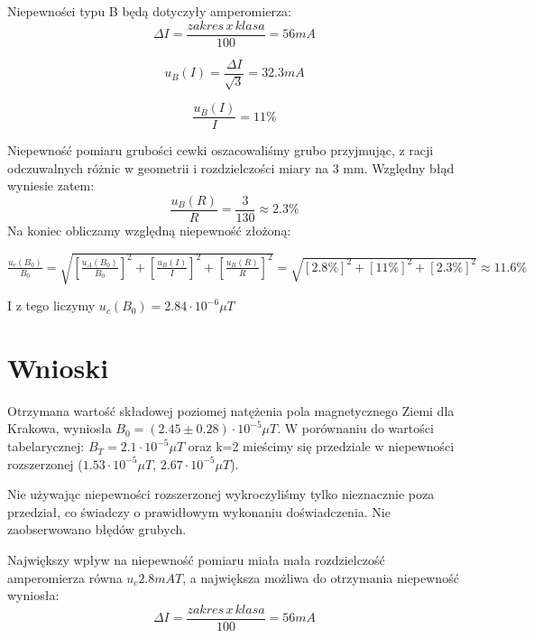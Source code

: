 \documentclass{article}
\begin{document}
Niepewności typu B będą dotyczyły amperomierza:
\begin{equation}
\Delta I = \frac{zakres \, x \, klasa}{100} = 56 mA
\end{equation}

\begin{equation}
u_B(I) = \frac{\Delta I}{\sqrt{3}} = 32.3 mA 
\end{equation}

\begin{equation}
\frac{u_B(I)}{I} = 11 \%
\end{equation}

Niepewność pomiaru grubości cewki oszacowaliśmy grubo przyjmując, z racji odczuwalnych różnic w geometrii i rozdzielczości miary na 3 mm.
Względny błąd wyniesie zatem:
\begin{equation}
\frac{u_B(R)}{R} = 	\frac{3}{130} \approx 2.3 \%
\end{equation}
Na koniec obliczamy względną niepewność złożoną: \\ \newline
\newline
\centerline{$\frac{u_c(B_0)}{B_0} = \sqrt{[\frac{u_A(B_0)}{B_0}]^2 + [\frac{u_B(I)}{I}]^2 + [\frac{u_B(R)}{R}]^2} = \sqrt{[2.8\%]^2+[11\%]^2+[2.3\%]^2} \approx 11.6 \%$}
\newline
\newline
I z tego liczymy $u_c(B_0) = 2.84 \cdot 10^{-6} \mu T$


\newpage

\section{Wnioski}

Otrzymana wartość składowej poziomej natężenia pola magnetycznego Ziemi dla Krakowa, wyniosła $B_0 = (2.45 \pm 0.28) \cdot 10^{-5} \mu T$. W porównaniu do wartości tabelarycznej: $B_T = 2.1 \cdot 10^{-5} \mu T$ oraz k=2 mieścimy się przedziale w niepewności rozszerzonej ($1.53 \cdot 10^{-5} \mu T$, $2.67 \cdot 10^{-5} \mu T$).

Nie używając niepewności rozszerzonej wykroczyliśmy tylko nieznacznie poza przedział, co świadczy o prawidłowym wykonaniu doświadczenia. Nie zaobserwowano błędów grubych.

Największy wpływ na niepewność pomiaru miała mała rozdzielczość amperomierza równa $u_c 2.8 mA T$, a największa możliwa do otrzymania niepewność wyniosła: \begin{equation}
\Delta I = \frac{zakres \, x \, klasa}{100} = 56 mA
\end{equation}





\end{document}
